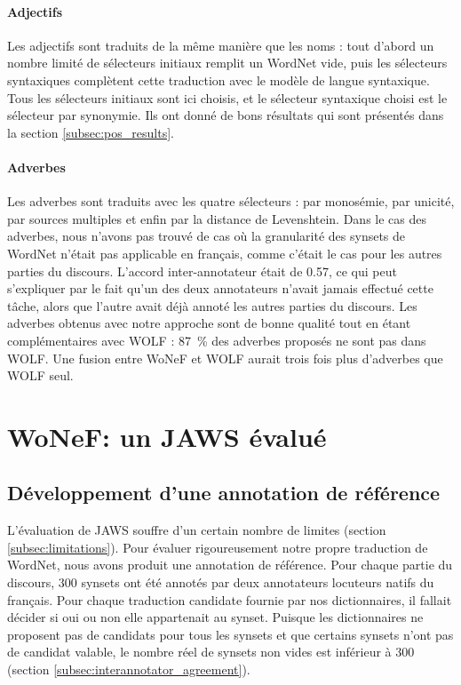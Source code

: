 \paragraph{Adjectifs} Les adjectifs sont traduits de la même manière que les
noms : tout d'abord un nombre limité de sélecteurs initiaux remplit un WordNet
vide, puis les sélecteurs syntaxiques complètent cette traduction avec le
modèle de langue syntaxique. Tous les sélecteurs initiaux sont ici choisis, et
le sélecteur syntaxique choisi est le sélecteur par synonymie. Ils ont donné de
bons résultats qui sont présentés dans la section \ref{subsec:pos_results}.

\paragraph{Adverbes} Les adverbes sont traduits avec les quatre sélecteurs :
par monosémie, par unicité, par sources multiples et enfin par la distance de
Levenshtein. Dans le cas des adverbes, nous n'avons pas trouvé de cas où la
granularité des synsets de WordNet n'était pas applicable en français, comme
c'était le cas pour les autres parties du discours. L'accord inter-annotateur
était de 0.57, ce qui peut s'expliquer par le fait qu'un des deux annotateurs
n'avait jamais effectué cette tâche, alors que l'autre avait déjà annoté les
autres parties du discours. Les adverbes obtenus avec notre approche sont de
bonne qualité tout en étant complémentaires avec WOLF : 87~\% des adverbes
proposés ne sont pas dans WOLF. Une fusion entre WoNeF et WOLF aurait trois
fois plus d'adverbes que WOLF seul.

\section{WoNeF: un JAWS évalué}
\label{sec:evaluating_jaws}

\subsection{Développement d'une annotation de référence}
\label{subsec:gold_standard}

L'évaluation de JAWS souffre d'un certain nombre de limites (section
\ref{subsec:limitations}). Pour évaluer rigoureusement notre propre traduction
de WordNet, nous avons produit une annotation de référence. Pour chaque partie
du discours, 300 synsets ont été annotés par deux annotateurs locuteurs natifs
du français. Pour chaque traduction candidate fournie par nos dictionnaires, il
fallait décider si oui ou non elle appartenait au synset. Puisque les
dictionnaires ne proposent pas de candidats pour tous les synsets et que
certains synsets n'ont pas de candidat valable, le nombre réel de synsets non
vides est inférieur à 300 (section \ref{subsec:interannotator_agreement}).

